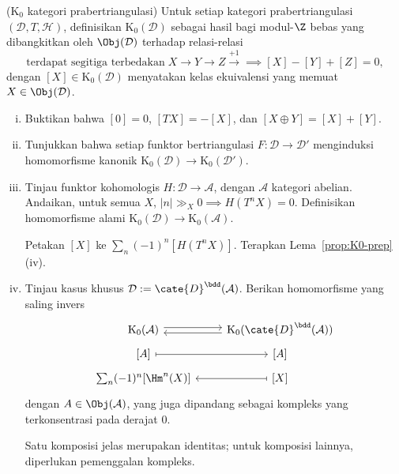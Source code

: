 \begin{Exercises}
	\item ($\mathrm{K}_0$ kategori prabertriangulasi) Untuk setiap kategori
	prabertriangulasi $(\mathcal{D},T,\mathcal{H})$, definisikan
	$\mathrm{K}_0(\mathcal{D})$ sebagai hasil bagi modul-$\Z$ bebas yang
	dibangkitkan oleh $\Obj(\mathcal{D})$ terhadap relasi-relasi
	\[ \text{terdapat segitiga terbedakan}\; X \to Y \to Z \xrightarrow{+1} \implies [X] - [Y] + [Z] = 0, \]
	dengan $[X]\in\mathrm{K}_0(\mathcal{D})$ menyatakan kelas ekuivalensi yang
	memuat $X\in\Obj(\mathcal{D})$.
	\begin{enumerate}[(i)]
		\item Buktikan bahwa $[0]=0$, $[TX]=-[X]$, dan
		$[X\oplus Y]=[X]+[Y]$.
		\item Tunjukkan bahwa setiap funktor bertriangulasi
		$F:\mathcal{D}\to\mathcal{D}'$ menginduksi homomorfisme kanonik
		$\mathrm{K}_0(\mathcal{D})\to\mathrm{K}_0(\mathcal{D}')$.
		\item Tinjau funktor kohomologis $H:\mathcal{D}\to\mathcal{A}$, dengan
		$\mathcal{A}$ kategori abelian. Andaikan, untuk semua $X$,
		$|n|\gg_X0\implies H(T^nX)=0$. Definisikan homomorfisme alami
		$\mathrm{K}_0(\mathcal{D})\to\mathrm{K}_0(\mathcal{A})$.
		
		\begin{hint}
			Petakan $[X]$ ke $\sum_n(-1)^n[H(T^nX)]$. Terapkan
			Lema~\ref{prop:K0-prep} (iv).
		\end{hint}
		\item Tinjau kasus khusus $\mathcal{D}:=\cate{D}^{\bdd}(\mathcal{A})$.
		Berikan homomorfisme yang saling invers
		\[\begin{tikzcd}[row sep=tiny]
			\mathrm{K}_0(\mathcal{A}) \arrow[shift left, r] & \mathrm{K}_0(\cate{D}^{\bdd}(\mathcal{A})) \arrow[shift left, l] \\
			{[A]} \arrow[mapsto, r] & {[A]} \\
			\sum_n (-1)^n {[\Hm^n(X)]} & {[X]} \arrow[mapsto, l]
		\end{tikzcd}\]
		dengan $A\in\Obj(\mathcal{A})$, yang juga dipandang sebagai kompleks
		yang terkonsentrasi pada derajat $0$.
		\begin{hint}
			Satu komposisi jelas merupakan identitas; untuk komposisi lainnya,
			diperlukan pemenggalan kompleks.
		\end{hint}
	\end{enumerate}
	 


\end{Exercises}
